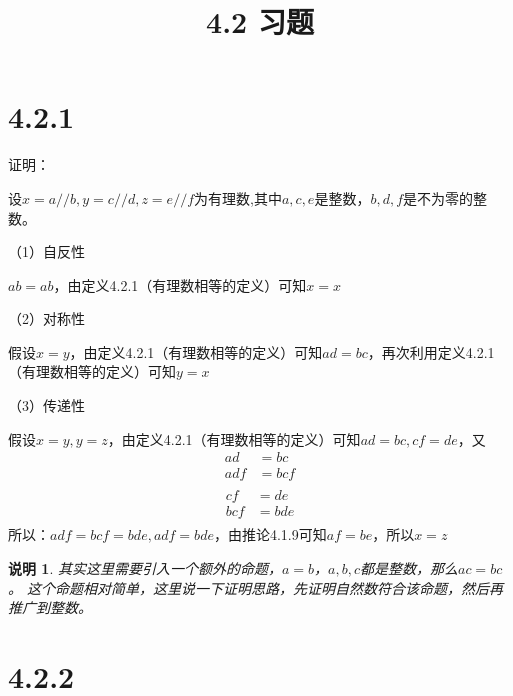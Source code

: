 \documentclass{article}
\theoremstyle{mystyle}
\newtheorem*{zremark}{说明}
\begin{document}
\title{4.2 习题}
\maketitle

\section*{4.2.1}

证明：

设$x=a//b,y=c//d,z=e//f$为有理数,其中$a,c,e$是整数，$b,d,f$是不为零的整数。

（1）自反性

$ab=ab$，由定义4.2.1（有理数相等的定义）可知$x=x$

（2）对称性

假设$x=y$，由定义4.2.1（有理数相等的定义）可知$ad=bc$，再次利用定义4.2.1（有理数相等的定义）可知$y=x$

（3）传递性

假设$x=y,y=z$，由定义4.2.1（有理数相等的定义）可知$ad=bc,cf=de$，又
\begin{align*}
  ad  & = bc  \\
  adf & = bcf \\
\end{align*}
\begin{align*}
  cf  & = de  \\
  bcf & = bde \\
\end{align*}
所以：$adf = bcf = bde, adf = bde$，由推论4.1.9可知$af=be$，所以$x=z$

\begin{zgraytheorem}
  \begin{zremark}
    其实这里需要引入一个额外的命题，$a=b$，$a,b,c$都是整数，那么$ac=bc$。
    这个命题相对简单，这里说一下证明思路，先证明自然数符合该命题，然后再推广到整数。
  \end{zremark}
\end{zgraytheorem}

\section*{4.2.2}
\end{document}

